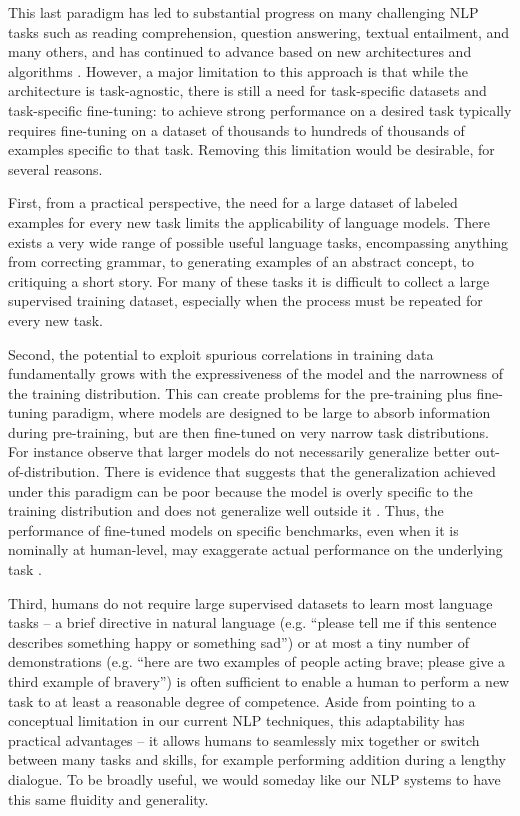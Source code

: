 This last paradigm has led to substantial progress on many challenging NLP tasks such as reading comprehension, question answering, textual entailment, and many others, and has continued to advance based on new architectures and algorithms \cite{raffel2019t5, liu2019roberta, yang2019xlnet, lan2019albert}. However, a major limitation to this approach is that while the architecture is task-agnostic, there is still a need for task-specific datasets and task-specific fine-tuning: to achieve strong performance on a desired task typically requires fine-tuning on a dataset of thousands to hundreds of thousands of examples specific to that task.  Removing this limitation would be desirable, for several reasons.

First, from a practical perspective, the need for a large dataset of labeled examples for every new task limits the applicability of language models.  There exists a very wide range of possible useful language tasks, encompassing anything from correcting grammar, to generating examples of an abstract concept, to critiquing a short story.  For many of these tasks it is difficult to collect a large supervised training dataset, especially when the process must be repeated for every new task.

Second, the potential to exploit spurious correlations in training data fundamentally grows with the expressiveness of the model and the narrowness of the training distribution. This can create problems for the pre-training plus fine-tuning paradigm, where models are designed to be large to absorb information during pre-training, but are then fine-tuned on very narrow task distributions. For instance \cite{hendrycks2020pretrained} observe that larger models do not necessarily generalize better out-of-distribution. There is evidence that suggests that the generalization achieved under this paradigm can be poor because the model is overly specific to the training distribution and does not generalize well outside it \cite{yogatama2019learning, mccoy2019right}. Thus, the performance of fine-tuned models on specific benchmarks, even when it is nominally at human-level, may exaggerate actual performance on the underlying task \cite{gururangan2018annotation, niven2019probing}.

Third, humans do not require large supervised datasets to learn most language tasks -- a brief directive in natural language (e.g. ``please tell me if this sentence describes something happy or something sad'') or at most a tiny number of demonstrations (e.g. ``here are two examples of people acting brave; please give a third example of bravery'') is often sufficient to enable a human to perform a new task to at least a reasonable degree of competence.  Aside from pointing to a conceptual limitation in our current NLP techniques, this adaptability has practical advantages -- it allows humans to seamlessly mix together or switch between many tasks and skills, for example performing addition during a lengthy dialogue.  To be broadly useful, we would someday like our NLP systems to have this same fluidity and generality.

